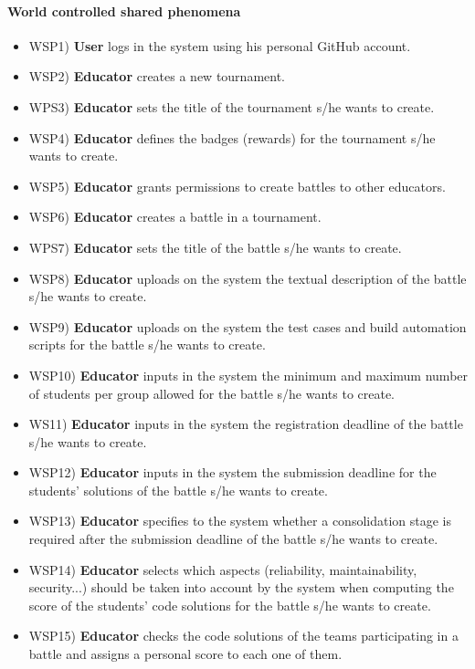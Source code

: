 	\paragraph{World controlled shared phenomena}
	\begin{itemize}
		\item WSP1) \textbf{User} logs in the system using his personal GitHub account.
		\item WSP2) \textbf{Educator} creates a new tournament.
		\item WPS3) \textbf{Educator} sets the title of the tournament s/he wants to create.
		\item WSP4) \textbf{Educator} defines the badges (rewards) for the tournament s/he wants to create.
		\item WSP5) \textbf{Educator} grants permissions to create battles to other educators.
		\item WSP6) \textbf{Educator} creates a battle in a tournament.
		\item WPS7) \textbf{Educator} sets the title of the battle s/he wants to create.
		\item WSP8) \textbf{Educator} uploads on the system the textual description of the battle s/he wants to create.
		\item WSP9) \textbf{Educator} uploads on the system the test cases and build automation scripts for the battle s/he wants to create.
		\item WSP10) \textbf{Educator} inputs in the system the minimum and maximum number of students per group allowed for the battle s/he wants to create.
		\item WS11) \textbf{Educator} inputs in the system the registration deadline of the battle s/he wants to create.
		\item WSP12) \textbf{Educator} inputs in the system the submission deadline for the students’ solutions of the battle s/he wants to create.
		\item WSP13) \textbf{Educator} specifies to the system whether a consolidation stage is required after the submission deadline of the battle s/he wants to create.
		\item WSP14) \textbf{Educator} selects which aspects (reliability, maintainability, security...) should be taken into account by the system when computing the score of the students' code solutions for the battle s/he wants to create.
		\item WSP15) \textbf{Educator} checks the code solutions of the teams participating in a battle and assigns a personal score to each one of them.

\end{itemize}
